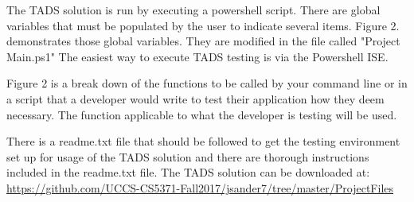 The TADS solution is run by executing a powershell script.  There are global variables that must be populated by the user to indicate several items.  Figure 2. demonstrates those global variables.  They are modified in the file called "Project Main.ps1"  The easiest way to execute TADS testing is via the Powershell ISE. 

Figure 2 is a break down of the functions to be called by your command line or in a script that a developer would write to test their application how they deem necessary.  The function applicable to what the developer is testing will be used.    

There is a readme.txt file that should be followed to get the testing environment set up for usage of the TADS solution and there are thorough instructions included in the readme.txt file.  The TADS solution can be downloaded at: \url{https://github.com/UCCS-CS5371-Fall2017/jsander7/tree/master/ProjectFiles} 


